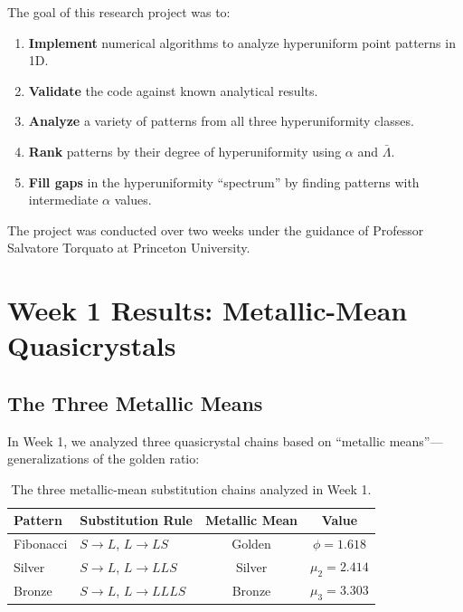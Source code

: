 \documentclass[11pt,letterpaper]{article}
\begin{document}
The goal of this research project was to:

\begin{enumerate}
    \item \textbf{Implement} numerical algorithms to analyze hyperuniform point patterns in 1D.

    \item \textbf{Validate} the code against known analytical results.

    \item \textbf{Analyze} a variety of patterns from all three hyperuniformity classes.

    \item \textbf{Rank} patterns by their degree of hyperuniformity using $\alpha$ and $\bar{\Lambda}$.

    \item \textbf{Fill gaps} in the hyperuniformity ``spectrum'' by finding patterns with intermediate $\alpha$ values.
\end{enumerate}

The project was conducted over two weeks under the guidance of Professor Salvatore Torquato at Princeton University.

\section{Week 1 Results: Metallic-Mean Quasicrystals}

\subsection{The Three Metallic Means}

In Week 1, we analyzed three quasicrystal chains based on ``metallic means''---generalizations of the golden ratio:

\begin{table}[H]
\centering
\begin{tabular}{llcc}
\toprule
\textbf{Pattern} & \textbf{Substitution Rule} & \textbf{Metallic Mean} & \textbf{Value} \\
\midrule
Fibonacci & $S \to L$, $L \to LS$ & Golden & $\phi = 1.618$ \\
Silver & $S \to L$, $L \to LLS$ & Silver & $\mu_2 = 2.414$ \\
Bronze & $S \to L$, $L \to LLLS$ & Bronze & $\mu_3 = 3.303$ \\
\bottomrule
\end{tabular}
\caption{The three metallic-mean substitution chains analyzed in Week 1.}
\end{table}
\end{document}
